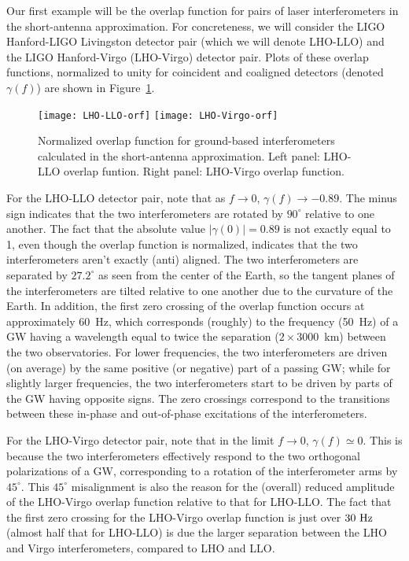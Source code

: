 Our first example will be the overlap function 
for pairs of laser interferometers in the short-antenna
approximation.
For concreteness, we will consider the 
LIGO Hanford-LIGO Livingston detector pair (which we will
denote LHO-LLO)
and the LIGO Hanford-Virgo (LHO-Virgo) detector pair.
Plots of these overlap functions, normalized to unity
for coincident and coaligned detectors 
(denoted $\gamma(f)$) are shown in Figure~\ref{f:orfs}.
%
\begin{figure}[htbp!]
\begin{center}
\texttt{[image: LHO-LLO-orf]}
\texttt{[image: LHO-Virgo-orf]}
\caption{Normalized overlap function for ground-based
interferometers calculated in the short-antenna approximation.
Left panel: LHO-LLO overlap funtion.
Right panel: LHO-Virgo overlap function.}
\label{f:orfs}
\end{center}
\end{figure}

For the LHO-LLO detector pair,
note that as $f\rightarrow 0$, $\gamma(f)\rightarrow -0.89$.
The minus sign indicates that the two interferometers
are rotated by $90^\circ$ relative to one another.
The fact that the absolute value $|\gamma(0)|=0.89$ is 
not exactly equal to 1, even though the overlap function
is normalized, indicates that the two interferometers
aren't exactly (anti) aligned.
The two interferometers are separated by $27.2^\circ$ as 
seen from the center of the Earth, so the tangent planes 
of the interferometers are tilted relative to one another due 
to the curvature of the Earth.
In addition, the first zero crossing of the overlap function
occurs at approximately 60~Hz, which corresponds (roughly)
to the frequency (50~Hz) of a GW having a wavelength 
equal to 
twice the separation ($2\times 3000$~km) between the two observatories.
For lower frequencies, the two interferometers are driven
(on average) by the same positive (or negative) part of a passing GW;
while for slightly larger frequencies, the two interferometers 
start to be driven by parts of the GW having opposite signs.  
The zero crossings correspond to the transitions between
these in-phase and out-of-phase excitations of the 
interferometers.

For the LHO-Virgo detector pair, note 
that in the limit $f\rightarrow 0$, $\gamma(f)\simeq 0$.
This is because the two interferometers effectively respond
to the two orthogonal polarizations of a GW, corresponding 
to a rotation of the interferometer arms by $45^\circ$.
This $45^\circ$ misalignment is also the reason for the 
(overall) reduced amplitude of the LHO-Virgo overlap 
function relative to that for LHO-LLO.  
The fact that the first zero crossing for the LHO-Virgo 
overlap function is just over $30~{\rm Hz}$ (almost half 
that for LHO-LLO) is due the larger separation between the
LHO and Virgo interferometers, compared to LHO 
and LLO.

